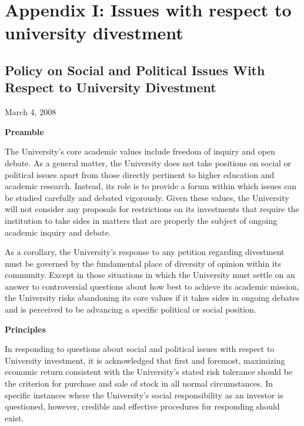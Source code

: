 


		\singlespacing
		\section{Appendix I: Issues with respect to university divestment}
		\label{sec:DivestmentPolicy}
		\doublespacing
		
		
		
	\subsection{Policy on Social and Political Issues With Respect to University Divestment}
	\label{PolicySocialPolitical}

	
	
March 4, 2008



\textbf{Preamble}

 

The University's core academic values include freedom of inquiry and open debate. As a general matter, the University does not take positions on social or political issues apart from those directly pertinent to higher education and academic research.  Instead, its role is to provide a forum within which issues can be studied carefully and debated vigorously. Given these values, the University will not consider any proposals for restrictions on its investments that require the institution to take sides in matters that are properly the subject of ongoing academic inquiry and debate.

 

As a corollary, the University's response to any petition regarding divestment must be governed by the fundamental place of diversity of opinion within its community. Except in those situations in which the University must settle on an answer to controversial questions about how best to achieve its academic mission, the University risks abandoning its core values if it takes sides in ongoing debates and is perceived to be advancing a specific political or social position.



\textbf{Principles}

 

In responding to questions about social and political issues with respect to University investment, it is acknowledged that first and foremost, maximizing economic return consistent with the University’s stated risk tolerance should be the criterion for purchase and sale of stock in all normal circumstances. In specific instances where the University's social responsibility as an investor is questioned, however, credible and effective procedures for responding should exist.

